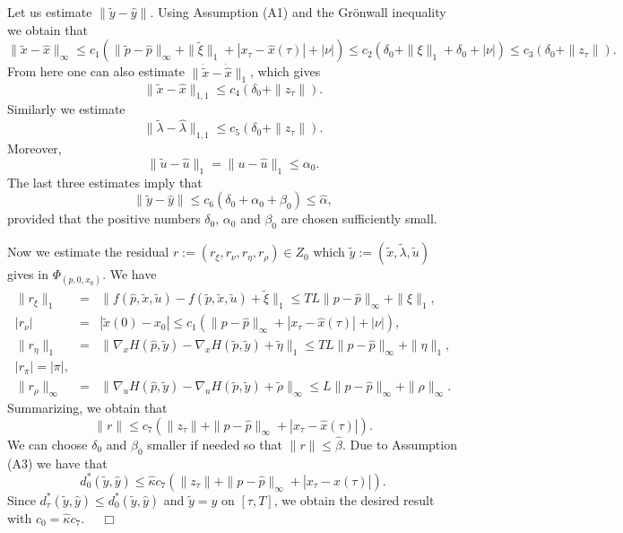 \documentclass[11pt]{article}
\newcommand{\bd}{\begin{displaymath}}
\newcommand{\ed}{\end{displaymath}}
\newcommand{\bda}{\begin{eqnarray*}}
\newcommand{\eda}{\end{eqnarray*}}
\renewenvironment{proof}[1]{%
\par\vspace{1\baselineskip}%
\noindent{\em Proof#1.\ \ }\ignorespaces }{%
\nobreak\hfill\mbox{\ \ $\Box$}%
\par\vspace{1\baselineskip}%
}
\newcommand{\al}{\alpha}
\begin{document}
\begin{proof}{}
Let us estimate $\| \tilde y - \hat y \|$. Using Assumption (A1) and the Gr\"{o}nwall inequality we obtain that 
\bd%
         \| \tilde x - \hat x \|_{\infty} \leq c_1 \left(\| \tilde p - \hat p \|_\infty + \| \tilde \xi \|_1  + 
         | x_\tau - \hat x(\tau) | + |\nu | \right) \leq
                 c_2 \left( \delta_0 + \| \xi \|_1 + \delta_0 + | \nu |\right) \leq c_3 (\delta_0 + \|  z_\tau \|).
\ed
From here one can also estimate $\| \dot{\tilde x} - \dot{\hat x} \|_1$, which gives
\bd
          \| \tilde x - \hat x \|_{1,1} \leq c_4 (\delta_0 + \|  z_\tau \|).
\ed
Similarly we estimate
\bd
              \| \tilde \lambda - \hat \lambda \|_{1,1} \leq c_5 (\delta_0 + \|  z_\tau \|).
\ed
Moreover, 
\bd
             \| \tilde u - \hat u\|_1 =  \| u - \hat u\|_1 \leq \al_0.
\ed
The last three estimates imply that 
\bd
               \| \tilde y - \hat y \| \leq c_6 (\delta_0 + \alpha_0 + \beta_0) \leq \hat \al,
\ed
provided that the positive numbers $\delta_0$, $\al_0$ and $\beta_0$ are chosen sufficiently small.

Now we estimate the residual $r := (r_\xi, r_\nu, r_\eta, r_\rho) \in Z_0$ 
which $\tilde y := (\tilde x, \tilde \lambda, \tilde u)$ gives in $\Phi_{(\hat p,0,x_0)}$. We have
\bda
              \| r_\xi \|_1 &=& \big\| f(\hat p, \tilde x, \tilde u) - f(\tilde p, \tilde x, \tilde u) + \tilde \xi \big\|_1
                  \leq  T L \| p - \hat p \|_\infty  + \| \xi \|_1, \\
              | r_\nu | &= & | \tilde x(0) - x_0 | \leq c_1( \| p - \hat p \|_\infty +  |x_\tau - \hat x(\tau)| + | \nu | ), \\
              \| r_\eta \|_1 &=&  \big\| \nabla_{\!\! x} H (\hat p, \tilde y) -  
                  \nabla_{\!\! x} H(\tilde p, \tilde y) + \tilde \eta \big\|_1 \leq  T L \| p - \hat p \|_\infty  + \| \eta \|_1, \\
                  |r_\pi| = |\pi|,\\ 
                \| r_\rho \|_\infty &=&  \| \nabla_{\!\! u} H (\hat p, \tilde y) -  
                  \nabla_{\!\! u} H(\tilde p, \tilde y) + \tilde \rho \|_\infty \leq  L \| p - \hat p \|_\infty  + \| \rho \|_\infty.
\eda
Summarizing, we obtain that 
\bd
               \| r \| \leq c_7 \left( \| z_\tau \| + \| p - \hat p \|_\infty + | x_\tau - \hat x(\tau) | \right).
\ed     
We can choose $\delta_0$ and $\beta_0$ smaller if needed so that $\|r\|\le\hat\beta$. Due to Assumption (A3) we have that
\bd
             d^*_0(\tilde y, \hat y) \leq \hat \kappa  c_7 \left( \| z_\tau \| + \| p - \hat p \|_\infty + | x_\tau - \hat x(\tau) | \right).
\ed
Since $d^*_\tau(\tilde y, \hat y) \leq d^*_0(\tilde y, \hat y)$ and $\tilde y = y$ on $[\tau,T]$, 
we obtain the desired result with $c_0 = \hat \kappa c_7$.
\end{proof}
\end{document}
